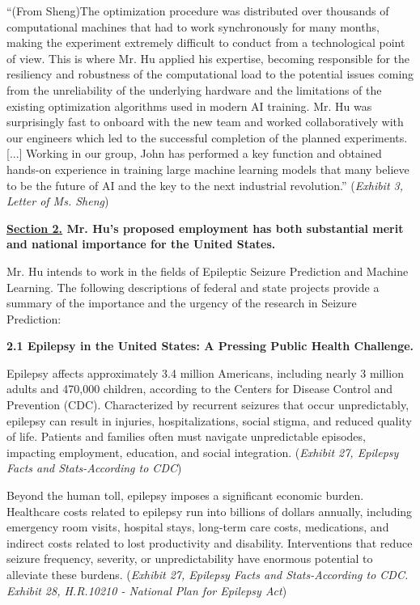 \documentclass{article}
\begin{document}
“(From Sheng)The optimization procedure was distributed over thousands of computational machines that had to work synchronously for many months, making the experiment extremely difficult to conduct from a technological point of view. This is where Mr. Hu applied his expertise, becoming responsible for the resiliency and robustness of the computational load to the potential issues coming from the unreliability of the underlying hardware and the limitations of the existing optimization algorithms used in modern AI training. Mr. Hu was surprisingly fast to onboard with the new team and worked collaboratively with our engineers which led to the successful completion of the planned experiments. [...] Working in our group, John has performed a key function and obtained hands-on experience in training large machine learning models that many believe to be the future of AI and the key to the next industrial revolution.” ({\it Exhibit 3, Letter of Ms. Sheng}) 


\clearpage


{\bf \underline{Section 2.} Mr. Hu’s proposed employment has both substantial merit and national importance for the United States.}

Mr. Hu intends to work in the fields of Epileptic Seizure Prediction and Machine Learning. The following descriptions of federal and state projects provide a summary of the importance and the urgency of the research in  Seizure Prediction:

{\bf 2.1 Epilepsy in the United States: A Pressing Public Health Challenge. }

Epilepsy affects approximately 3.4 million Americans, including nearly 3 million adults and 470,000 children, according to the Centers for Disease Control and Prevention (CDC). Characterized by recurrent seizures that occur unpredictably, epilepsy can result in injuries, hospitalizations, social stigma, and reduced quality of life. Patients and families often must navigate unpredictable episodes, impacting employment, education, and social integration. ({\it Exhibit 27, Epilepsy Facts and Stats-According to CDC}) 


Beyond the human toll, epilepsy imposes a significant economic burden. Healthcare costs related to epilepsy run into billions of dollars annually, including emergency room visits, hospital stays, long-term care costs, medications, and indirect costs related to lost productivity and disability. Interventions that reduce seizure frequency, severity, or unpredictability have enormous potential to alleviate these burdens. ({\it Exhibit 27, Epilepsy Facts and Stats-According to CDC.}  {\it Exhibit 28, H.R.10210 - National Plan for Epilepsy Act})
\end{document}
